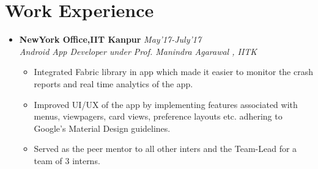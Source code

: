 \documentclass[10pt]{scrbook}
\begin{document}
\section*{Work Experience}
\begin{itemize}
\item \textbf{NewYork Office,IIT Kanpur} \hfill\textit{May'17-July'17}\\
\textit{Android App Developer under Prof. Manindra Agarawal , IITK}
\begin{itemize}
\item Integrated Fabric library in app which made it easier to monitor the crash reports and real time analytics of the app.
\item Improved UI/UX of the app by implementing features associated with menus, viewpagers, card views, preference layouts etc. adhering to Google’s Material Design guidelines.
\item Served as the peer mentor to all other inters and the Team-Lead for a team of 3 interns.

\end{itemize}
\end{itemize}
\end{document}
